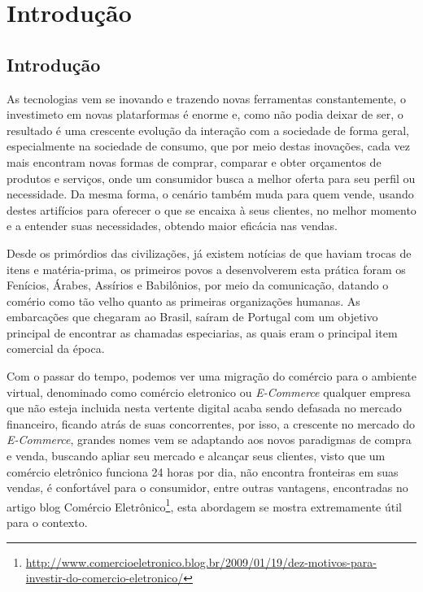 \part{Introdução}
\chapter[Introdução]{Introdução}

As tecnologias vem se inovando e trazendo novas ferramentas constantemente, o investimeto em novas platarformas é enorme e, como não podia deixar de ser, o resultado é uma crescente evolução da interação com a sociedade de forma geral, especialmente na sociedade de consumo, que por meio destas inovações, cada vez mais encontram novas formas de comprar, comparar e obter orçamentos de produtos e serviços, onde um consumidor busca a melhor oferta para seu perfil ou necessidade. Da mesma forma, o cenário também muda para quem vende, usando destes artifícios para oferecer o que se encaixa à seus clientes, no melhor momento e a entender suas necessidades, obtendo maior eficácia nas vendas.

Desde os primórdios das civilizações, já existem notícias de que haviam trocas de itens e matéria-prima, os primeiros povos a desenvolverem esta prática foram os Fenícios, Árabes, Assírios e Babilônios, por meio da comunicação, datando o comério como tão velho quanto as primeiras organizações humanas. As embarcações que chegaram ao Brasil, saíram de Portugal com um objetivo principal de encontrar as chamadas especiarias, as quais eram o principal item comercial da época\cite{furtado:2009}.

Com o passar do tempo, podemos ver uma migração do comércio para o ambiente virtual, denominado como comércio eletronico ou \textit{E-Commerce} qualquer empresa que não esteja incluida nesta vertente digital acaba sendo defasada no mercado financeiro, ficando atrás de suas concorrentes\cite{roque:2012}, por isso, a crescente no mercado do \textit{E-Commerce}, grandes nomes vem se adaptando aos novos paradigmas de compra e venda, buscando apliar seu mercado e alcançar seus clientes, visto que um comércio eletrônico funciona 24 horas por dia, não encontra fronteiras em suas vendas, é confortável para o consumidor, entre outras vantagens, encontradas no artigo blog Comércio Eletrônico\footnote{\url{http://www.comercioeletronico.blog.br/2009/01/19/dez-motivos-para-investir-do-comercio-eletronico/}}, esta abordagem se mostra extremamente útil para o contexto.

